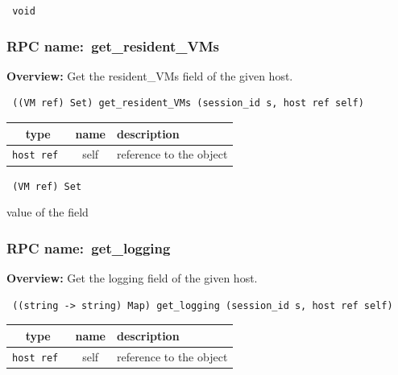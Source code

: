{\tt 
void
}



\vspace{0.3cm}
\vspace{0.3cm}
\vspace{0.3cm}
\subsubsection{RPC name:~get\_resident\_VMs}

{\bf Overview:} 
Get the resident\_VMs field of the given host.

\begin{verbatim} ((VM ref) Set) get_resident_VMs (session_id s, host ref self)\end{verbatim}



 
\vspace{0.3cm}
\begin{tabular}{|c|c|p{7cm}|}
 \hline
{\bf type} & {\bf name} & {\bf description} \\ \hline
{\tt host ref } & self & reference to the object \\ \hline 

\end{tabular}

\vspace{0.3cm}

{\tt 
(VM ref) Set
}


value of the field
\vspace{0.3cm}
\vspace{0.3cm}
\vspace{0.3cm}
\subsubsection{RPC name:~get\_logging}

{\bf Overview:} 
Get the logging field of the given host.

\begin{verbatim} ((string -> string) Map) get_logging (session_id s, host ref self)\end{verbatim}



 
\vspace{0.3cm}
\begin{tabular}{|c|c|p{7cm}|}
 \hline
{\bf type} & {\bf name} & {\bf description} \\ \hline
{\tt host ref } & self & reference to the object \\ \hline 

\end{tabular}

